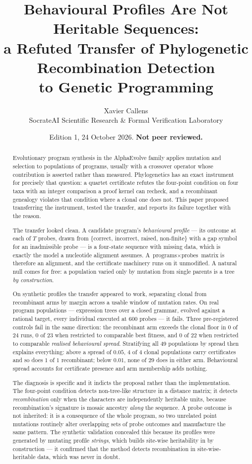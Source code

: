 \documentclass[11pt,a4paper]{article}
\title{\textbf{Behavioural Profiles Are Not Heritable Sequences:\\
a Refuted Transfer of Phylogenetic Recombination Detection\\
to Genetic Programming}}
\author{Xavier Callens\\
\small SocrateAI Scientific Research \& Formal Verification Laboratory}
\date{Edition 1, 24 October 2026. \textbf{Not peer reviewed.}}
\theoremstyle{definition}
\theoremstyle{remark}
\begin{document}
\maketitle

\begin{abstract}
Evolutionary program synthesis in the AlphaEvolve family applies mutation and
selection to populations of programs, usually with a crossover operator whose
contribution is asserted rather than measured. Phylogenetics has an exact
instrument for precisely that question: a quartet certificate refutes the
four-point condition on four taxa with an integer comparison a proof kernel can
recheck, and a recombinant genealogy violates that condition where a clonal one
does not. This paper proposed transferring the instrument, tested the transfer,
and reports its failure together with the reason.

The transfer looked clean. A candidate program's \emph{behavioural profile} ---
its outcome at each of $T$ probes, drawn from \{correct, incorrect, raised,
non-finite\} with a gap symbol for an inadmissible probe --- is a four-state
sequence with missing data, which is exactly the model a nucleotide alignment
assumes. A $\text{programs} \times \text{probes}$ matrix is therefore an
alignment, and the certificate machinery runs on it unmodified. A natural null
comes for free: a population varied only by mutation from single parents is a
tree \emph{by construction}.

On synthetic profiles the transfer appeared to work, separating clonal from
recombinant arms by margin across a usable window of mutation rates. On real
program populations --- expression trees over a closed grammar, evolved against a
rational target, every individual executed at 600 probes --- it fails. Three
pre-registered controls fail in the same direction: the recombinant arm exceeds
the clonal floor in $0$ of $24$ runs, $0$ of $23$ when restricted to comparable
best fitness, and $0$ of $22$ when restricted to comparable \emph{realised
behavioural spread}. Stratifying all $49$ populations by spread then explains
everything: above a spread of $0.05$, $4$ of $4$ clonal populations carry
certificates and so does $1$ of $1$ recombinant; below $0.01$, none of $29$ does
in either arm. Behavioural spread accounts for certificate presence and arm
membership adds nothing.

The diagnosis is specific and it indicts the proposal rather than the
implementation. The four-point condition detects non-tree-like structure in a
distance matrix; it detects \emph{recombination} only when the characters are
independently heritable units, because recombination's signature is mosaic
ancestry \emph{along} the sequence. A probe outcome is not inherited: it is a
consequence of the whole program, so two unrelated point mutations routinely
alter overlapping sets of probe outcomes and manufacture the same pattern. The
synthetic validation concealed this because its profiles were generated by
mutating profile \emph{strings}, which builds site-wise heritability in by
construction --- it confirmed that the method detects recombination in
site-wise-heritable data, which was never in doubt.


\end{abstract}
\end{document}
